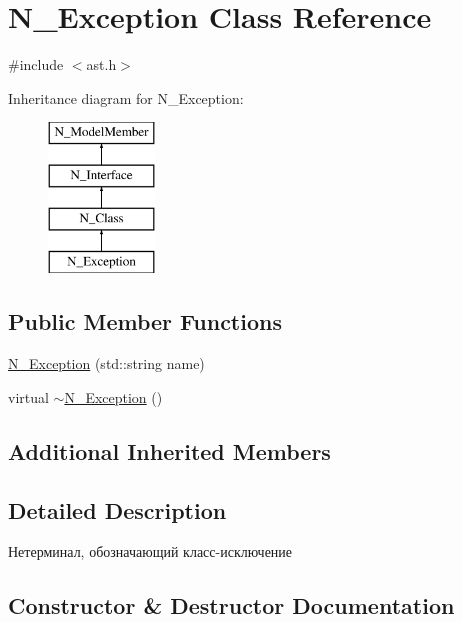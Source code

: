 \hypertarget{classN__Exception}{}\section{N\+\_\+\+Exception Class Reference}
\label{classN__Exception}


{\ttfamily \#include $<$ast.\+h$>$}

Inheritance diagram for N\+\_\+\+Exception\+:\begin{figure}[H]
\begin{center}
\leavevmode
\includegraphics[height=4.000000cm]{classN__Exception}
\end{center}
\end{figure}
\subsection*{Public Member Functions}
\begin{DoxyCompactItemize}
\item 
\hyperlink{classN__Exception_ad705909149371a006ea58a28cb4aae24}{N\+\_\+\+Exception} (std\+::string name)
\item 
virtual \hyperlink{classN__Exception_aa30734467c1f14824e646aa7a69ea945}{$\sim$\+N\+\_\+\+Exception} ()
\end{DoxyCompactItemize}
\subsection*{Additional Inherited Members}


\subsection{Detailed Description}
Нетерминал, обозначающий класс-\/исключение 

\subsection{Constructor \& Destructor Documentation}
\hypertarget{classN__Exception_ad705909149371a006ea58a28cb4aae24}{}

